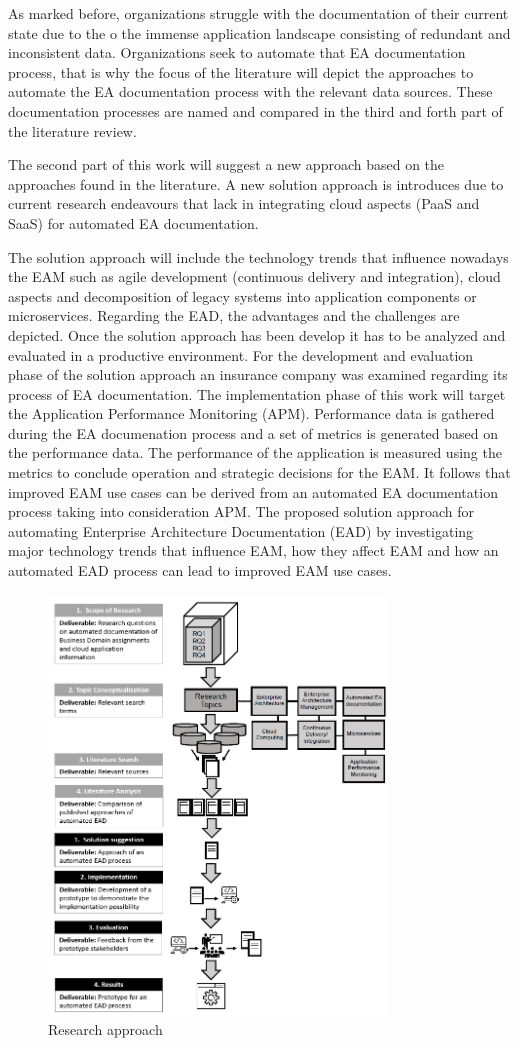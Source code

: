 As marked before, organizations struggle with the documentation of their current state due to the o the immense application landscape consisting of redundant and inconsistent data. Organizations seek to automate that EA documentation process, that is why the focus of the literature will depict the approaches to automate the EA documentation process with the relevant data sources. These documentation processes are named and compared in the third and forth part of the literature review.

The second part of this work will suggest a new approach based on the approaches found in the literature. A new solution approach is introduces due to current research endeavours that lack in integrating cloud aspects (PaaS and SaaS) for automated EA documentation. 

The solution approach will include the technology trends that influence nowadays the EAM such as agile development (continuous delivery and integration), cloud aspects and decomposition of legacy systems into application components or microservices. Regarding the EAD, the advantages and the challenges are depicted. Once the solution approach has been develop it has to be analyzed and evaluated in a productive environment. For the development and evaluation phase of the solution approach an insurance company was examined regarding its process of EA documentation. The implementation phase of this work will target the Application Performance Monitoring (APM). Performance data is gathered during the EA documenation process and a set of metrics is generated based on the performance data. The performance of the application is measured using the metrics to conclude operation and strategic decisions for the EAM. It follows that improved EAM use cases can be derived from an automated EA documentation process taking into consideration APM. The proposed solution approach for automating Enterprise Architecture Documentation (EAD) by investigating major technology trends that influence EAM, how they affect EAM and how an automated EAD process can lead to improved EAM use cases.
\begin{figure}[htpb]
  \centering
  \includegraphics[width=0.8\textwidth]{figures/approach.PNG}
  \caption{Research approach~\parencite{Corpancho Villasana 2018}}
  \label{fig:research-approach}
\end{figure}